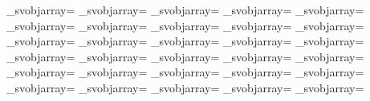 {{{{            \fontdimen\indexb\_svobjarray=\onesp
            \advance\indexb\cntDeltaBC
            \fontdimen\indexb\_svobjarray=\onesp
            \advance\indexb\cntDeltaBD
            \fontdimen\indexb\_svobjarray=\onesp
            \advance\indexb\cntDeltaBE
            \fontdimen\indexb\_svobjarray=\onesp
            \advance\indexb\cntDeltaBF
            \fontdimen\indexb\_svobjarray=\onesp
            \advance\indexb\cntDeltaBG
            \fontdimen\indexb\_svobjarray=\onesp
            \advance\indexb\cntDeltaBH
            \fontdimen\indexb\_svobjarray=\onesp
            \advance\indexb\cntDeltaCA
            \fontdimen\indexb\_svobjarray=\onesp
            \advance\indexb\cntDeltaCB
            \fontdimen\indexb\_svobjarray=\onesp
            \advance\indexb\cntDeltaCC
            \fontdimen\indexb\_svobjarray=\onesp
            \advance\indexb\cntDeltaCD
            \fontdimen\indexb\_svobjarray=\onesp
            \advance\indexb\cntDeltaCE
            \fontdimen\indexb\_svobjarray=\onesp
            \advance\indexb\cntDeltaCF
            \fontdimen\indexb\_svobjarray=\onesp
            \advance\indexb\cntDeltaCG
            \fontdimen\indexb\_svobjarray=\onesp
            \advance\indexb\cntDeltaCH
            \fontdimen\indexb\_svobjarray=\onesp
            \advance\indexb\cntDeltaDA
            \fontdimen\indexb\_svobjarray=\onesp
            \advance\indexb\cntDeltaDB
            \fontdimen\indexb\_svobjarray=\onesp
            \advance\indexb\cntDeltaDC
            \fontdimen\indexb\_svobjarray=\onesp
            \advance\indexb\cntDeltaDD
            \fontdimen\indexb\_svobjarray=\onesp
            \advance\indexb\cntDeltaDE
            \fontdimen\indexb\_svobjarray=\onesp
            \advance\indexb\cntDeltaDF
            \fontdimen\indexb\_svobjarray=\onesp
            \advance\indexb\cntDeltaDG
            \fontdimen\indexb\_svobjarray=\onesp
            \advance\indexb\cntDeltaDH
            \fontdimen\indexb\_svobjarray=\onesp
            \advance\indexb\cntDeltaEA
            \fontdimen\indexb\_svobjarray=\onesp
            \advance\indexb\cntDeltaEB
            \fontdimen\indexb\_svobjarray=\onesp
            \advance\indexb\cntDeltaEC
            \fontdimen\indexb\_svobjarray=\onesp
            \advance\indexb\cntDeltaED
            \fontdimen\indexb\_svobjarray=\onesp
            \advance\indexb\cntDeltaEE
            \fontdimen\indexb\_svobjarray=\onesp
            \advance\indexb\cntDeltaEF
            \fontdimen\indexb\_svobjarray=\onesp
            \advance\indexb\cntDeltaEG
            \fontdimen\indexb\_svobjarray=\onesp
}}}}
